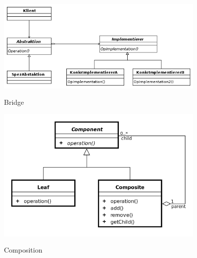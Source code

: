 \begin{figure}[htb]
    \centering
    \begin{minipage}[t]{0.45\linewidth}
		\centering
		\includegraphics[width=0.9\textwidth]{images/bridge}
		\label{fig:bridge}
		\caption{Bridge}
	\end{minipage}%
	\hfill
    \begin{minipage}[t]{0.45\linewidth}
		\centering
		\includegraphics[width=0.9\textwidth]{images/composite}
		\label{fig:composite}
		\caption{Composition}
	\end{minipage}
\end{figure}


